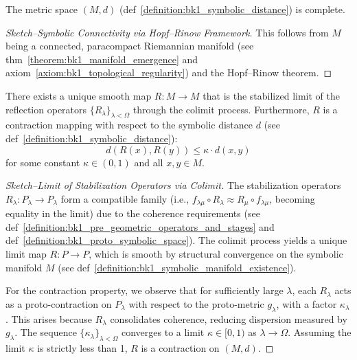 \begin{lemma}
\label{lemma:bk1_completeness_of_symbolic_distance}
The metric space $(M, d)$ (def~\ref{definition:bk1_symbolic_distance}) is complete.
\begin{proof}[Sketch–Symbolic Connectivity via Hopf–Rinow Framework]
\label{proof:bk1_sketch_symbolic_connectivity}
This follows from $M$ being a connected, paracompact Riemannian manifold (see thm~\ref{theorem:bk1_manifold_emergence} and axiom~\ref{axiom:bk1_topological_regularity}) and the Hopf–Rinow theorem.
\end{proof}
\end{lemma}
\begin{theorem}
\label{theorem:bk1_emergence_of_reflection_operator}
There exists a unique smooth map $R: M \to M$ that is the stabilized limit of the reflection operators $\{R_\lambda\}_{\lambda < \Omega}$ through the colimit process. Furthermore, $R$ is a contraction mapping with respect to the symbolic distance $d$ (see def~\ref{definition:bk1_symbolic_distance}):
\[
d(R(x),R(y)) \leq \kappa \cdot d(x,y)
\]
for some constant $\kappa \in (0,1)$ and all $x,y \in M$.

\begin{proof}[Sketch–Limit of Stabilization Operators via Colimit]
\label{proof:bk1_sketch_limit_stabilization_colimit}
The stabilization operators $R_\lambda: P_\lambda \to P_\lambda$ form a compatible family (i.e., $f_{\lambda\mu} \circ R_\lambda \approx R_\mu \circ f_{\lambda\mu}$, becoming equality in the limit) due to the coherence requirements (see def~\ref{definition:bk1_pre_geometric_operators_and_stages} and def~\ref{definition:bk1_proto_symbolic_space}). The colimit process yields a unique limit map $R: P \to P$, which is smooth by structural convergence on the symbolic manifold $M$ (see def~\ref{definition:bk1_symbolic_manifold_existence}).

For the contraction property, we observe that for sufficiently large $\lambda$, each $R_\lambda$ acts as a proto-contraction on $P_\lambda$ with respect to the proto-metric $g_\lambda$, with a factor $\kappa_\lambda$. This arises because $R_\lambda$ consolidates coherence, reducing dispersion measured by $g_\lambda$. The sequence $\{\kappa_\lambda\}_{\lambda < \Omega}$ converges to a limit $\kappa \in [0,1)$ as $\lambda \to \Omega$. Assuming the limit $\kappa$ is strictly less than 1, $R$ is a contraction on $(M,d)$.
\end{proof}
\end{theorem}

